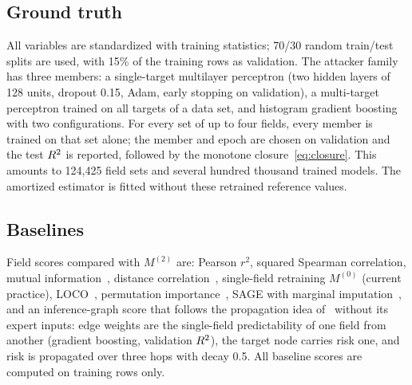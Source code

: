 \begin{table}[!tp]
\centering\small
\caption{Data sets. $n$: train/test rows; $p$: candidate fields; sets: field sets with exact
three-attacker ground truth.}\label{tab:data}
\end{table}

\subsection{Ground truth}
All variables are standardized with training statistics; 70/30 random train/test splits are
used, with 15\% of the training rows as validation. The attacker family has three members: a
single-target multilayer perceptron (two hidden layers of 128 units, dropout 0.15, Adam,
early stopping on validation), a multi-target perceptron trained on all targets of a data set,
and histogram gradient boosting with two configurations. For every set of up to four fields,
every member is trained on that set alone; the member and epoch are chosen on validation and the
test $R^2$ is reported, followed by the monotone closure~\eqref{eq:closure}. This amounts to
124,425 field sets and several hundred thousand trained models. The amortized estimator is fitted without these retrained reference values.

\subsection{Baselines}
Field scores compared with $M^{(2)}$ are: Pearson $r^2$, squared Spearman correlation, mutual
information~\cite{kraskov2004mi}, distance correlation~\cite{szekely2007dcor}, single-field
retraining $M^{(0)}$ (current practice), LOCO~\cite{lei2018loco}, permutation
importance~\cite{breiman2001rf}, SAGE with marginal imputation~\cite{covert2020sage}, and an
inference-graph score that follows the propagation idea of~\cite{hu2026ignn} without its expert
inputs: edge weights are the single-field predictability of one field from another (gradient
boosting, validation $R^2$), the target node carries risk one, and risk is propagated over three
hops with decay 0.5. All baseline scores are computed on training rows only.

